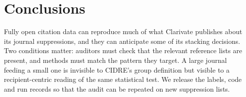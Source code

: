 \section{Conclusions}\label{sec:conclusions}
Fully open citation data can reproduce much of what Clarivate publishes about its journal suppressions, and they can
anticipate some of its stacking decisions. Two conditions matter: auditors must check that the relevant reference
lists are present, and methods must match the pattern they target. A large journal feeding a small one is invisible to
CIDRE's group definition but visible to a recipient-centric reading of the same statistical test. We release the
labels, code and run records so that the audit can be repeated on new suppression lists.
